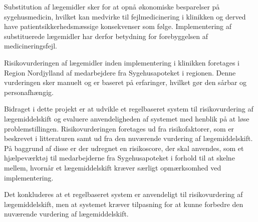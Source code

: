 \vspace{-0.3cm}
Substitution af lægemidler sker for at opnå økonomiske besparelser på sygehusmedicin, hvilket kan medvirke til fejlmedicinering i klinikken og derved have patientsikkerhedsmæssige konsekvenser som følge. Implementering af substituerede lægemidler har derfor betydning for forebyggelsen af medicineringsfejl. 

Risikovurderingen af lægemidler inden implementering i klinikken foretages i Region Nordjylland af medarbejdere fra Sygehusapoteket i regionen. Denne vurderingen sker manuelt og er baseret på erfaringer, hvilket gør den sårbar og personafhængig. 


Bidraget i dette projekt er at udvikle et regelbaseret system til risikovurdering af lægemiddelskift og evaluere anvendeligheden af systemet med henblik på at løse problemstillingen. Risikovurderingen foretages ud fra risikofaktorer, som er beskrevet i litteraturen samt ud fra den nuværende vurdering af lægemiddelskift. På baggrund af disse er der udregnet en risikoscore, der skal anvendes, som et hjælpeværktøj til medarbejderne fra Sygehusapoteket i forhold til at skelne mellem, hvornår et lægemiddelskift kræver særligt opmærksomhed ved implementering.

Det konkluderes at et regelbaseret system er anvendeligt til risikovurdering af lægemiddelskift, men at systemet kræver tilpasning for at kunne forbedre den nuværende vurdering af lægemiddelskift.
\vspace{-0.2cm}
